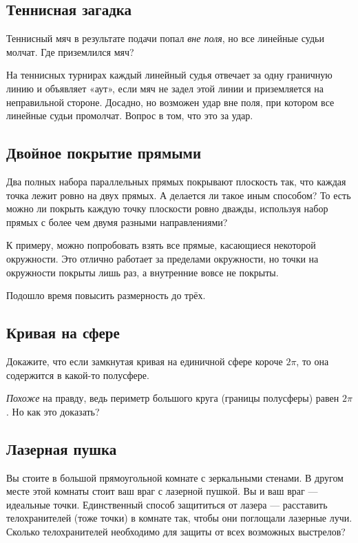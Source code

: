 \subsection*{Теннисная загадка}

Теннисный мяч в результате подачи попал \emph{вне поля}, но все линейные судьи молчат.
Где приземлился мяч?

На теннисных турнирах каждый линейный судья отвечает за одну граничную линию и объявляет «аут», если мяч не задел этой линии и приземляется на неправильной стороне.
Досадно, но возможен удар вне поля, при котором все линейные судьи промолчат.
Вопрос в том, что это за удар.

\subsection*{Двойное покрытие прямыми}

Два полных набора параллельных прямых покрывают плоскость так, что каждая точка лежит ровно на двух прямых.
А делается ли такое иным способом?
То есть можно ли покрыть каждую точку плоскости ровно дважды, используя набор прямых с более чем двумя разными направлениями?

 К примеру, можно попробовать взять все прямые, касающиеся некоторой окружности.
Это отлично работает за пределами окружности, но точки на окружности покрыты лишь раз, а внутренние вовсе не покрыты.

\medskip

Подошло время повысить размерность до трёх.

\subsection*{Кривая на сфере}

Докажите, что если замкнутая кривая на единичной сфере короче $2\pi$, то она содержится в какой-то полусфере.

 \emph{Похоже} на правду, ведь периметр большого круга (границы полусферы) равен $2\pi$.
Но как это доказать?

\subsection*{Лазерная пушка}

Вы стоите в большой прямоугольной комнате с зеркальными стенами.
В другом месте этой комнаты стоит ваш враг с лазерной пушкой.
Вы и ваш враг --- идеальные точки.
Единственный способ защититься от лазера --- расставить телохранителей (тоже точки) в комнате так, чтобы они поглощали лазерные лучи.
Сколько телохранителей необходимо для защиты от всех возможных выстрелов?

